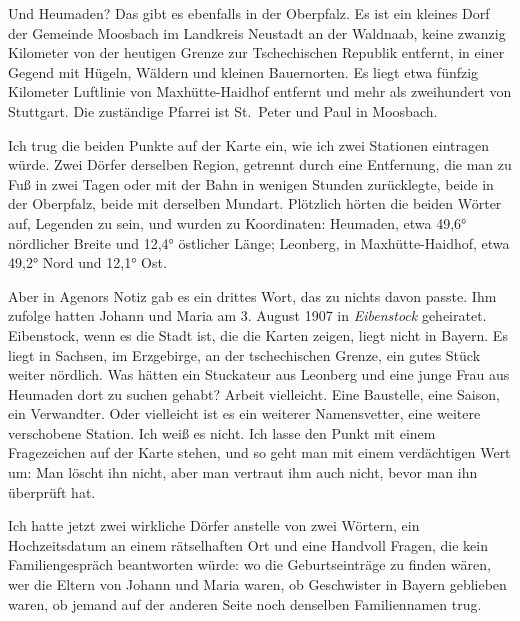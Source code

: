 \documentclass[
  ngerman,
  11pt,
  openany]{book}
\begin{document}
Und Heumaden? Das gibt es ebenfalls in der Oberpfalz. Es ist ein kleines
Dorf der Gemeinde Moosbach im Landkreis Neustadt an der Waldnaab, keine
zwanzig Kilometer von der heutigen Grenze zur Tschechischen Republik
entfernt, in einer Gegend mit Hügeln, Wäldern und kleinen Bauernorten.
Es liegt etwa fünfzig Kilometer Luftlinie von Maxhütte-Haidhof entfernt
und mehr als zweihundert von Stuttgart. Die zuständige Pfarrei ist
St.~Peter und Paul in Moosbach.

Ich trug die beiden Punkte auf der Karte ein, wie ich zwei Stationen
eintragen würde. Zwei Dörfer derselben Region, getrennt durch eine
Entfernung, die man zu Fuß in zwei Tagen oder mit der Bahn in wenigen
Stunden zurücklegte, beide in der Oberpfalz, beide mit derselben
Mundart. Plötzlich hörten die beiden Wörter auf, Legenden zu sein, und
wurden zu Koordinaten: Heumaden, etwa 49,6° nördlicher Breite und 12,4°
östlicher Länge; Leonberg, in Maxhütte-Haidhof, etwa 49,2° Nord und
12,1° Ost.

Aber in Agenors Notiz gab es ein drittes Wort, das zu nichts davon
passte. Ihm zufolge hatten Johann und Maria am 3. August 1907 in
\emph{Eibenstock} geheiratet. Eibenstock, wenn es die Stadt ist, die die
Karten zeigen, liegt nicht in Bayern. Es liegt in Sachsen, im
Erzgebirge, an der tschechischen Grenze, ein gutes Stück weiter
nördlich. Was hätten ein Stuckateur aus Leonberg und eine junge Frau aus
Heumaden dort zu suchen gehabt? Arbeit vielleicht. Eine Baustelle, eine
Saison, ein Verwandter. Oder vielleicht ist es ein weiterer
Namensvetter, eine weitere verschobene Station. Ich weiß es nicht. Ich
lasse den Punkt mit einem Fragezeichen auf der Karte stehen, und so geht
man mit einem verdächtigen Wert um: Man löscht ihn nicht, aber man
vertraut ihm auch nicht, bevor man ihn überprüft hat.

Ich hatte jetzt zwei wirkliche Dörfer anstelle von zwei Wörtern, ein
Hochzeitsdatum an einem rätselhaften Ort und eine Handvoll Fragen, die
kein Familiengespräch beantworten würde: wo die Geburtseinträge zu
finden wären, wer die Eltern von Johann und Maria waren, ob Geschwister
in Bayern geblieben waren, ob jemand auf der anderen Seite noch
denselben Familiennamen trug.
\end{document}

